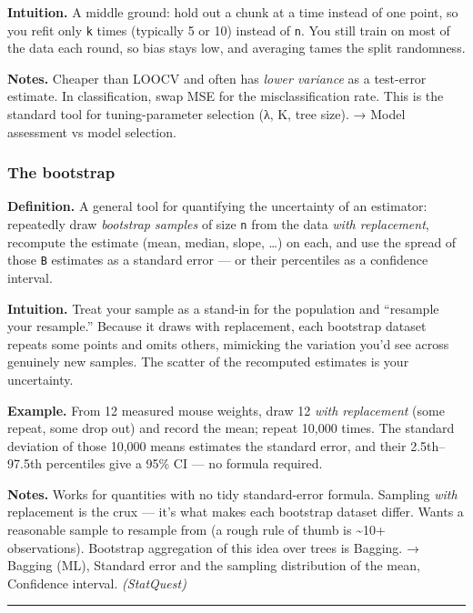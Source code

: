 \documentclass[
  10pt,
  letterpaper,
  onecolumn]{article}
\begin{document}
\textbf{Intuition.} A middle ground: hold out a chunk at a time instead
of one point, so you refit only \texttt{k} times (typically 5 or 10)
instead of \texttt{n}. You still train on most of the data each round,
so bias stays low, and averaging tames the split randomness.

\textbf{Notes.} Cheaper than LOOCV and often has \emph{lower variance}
as a test-error estimate. In classification, swap MSE for the
misclassification rate. This is the standard tool for tuning-parameter
selection (λ, K, tree size). → Model assessment vs model selection.

\hypertarget{the-bootstrap}{%
\subsubsection{The bootstrap}\label{the-bootstrap}}

\textbf{Definition.} A general tool for quantifying the uncertainty of
an estimator: repeatedly draw \emph{bootstrap samples} of size
\texttt{n} from the data \emph{with replacement}, recompute the estimate
(mean, median, slope, \ldots) on each, and use the spread of those
\texttt{B} estimates as a standard error --- or their percentiles as a
confidence interval.

\textbf{Intuition.} Treat your sample as a stand-in for the population
and ``resample your resample.'' Because it draws with replacement, each
bootstrap dataset repeats some points and omits others, mimicking the
variation you'd see across genuinely new samples. The scatter of the
recomputed estimates is your uncertainty.

\textbf{Example.} From 12 measured mouse weights, draw 12 \emph{with
replacement} (some repeat, some drop out) and record the mean; repeat
10,000 times. The standard deviation of those 10,000 means estimates the
standard error, and their 2.5th--97.5th percentiles give a 95\% CI ---
no formula required.

\textbf{Notes.} Works for quantities with no tidy standard-error
formula. Sampling \emph{with} replacement is the crux --- it's what
makes each bootstrap dataset differ. Wants a reasonable sample to
resample from (a rough rule of thumb is \textasciitilde10+
observations). Bootstrap aggregation of this idea over trees is Bagging.
→ Bagging (ML), Standard error and the sampling distribution of the
mean, Confidence interval. \emph{(StatQuest)}

\begin{center}\rule{0.5\linewidth}{0.5pt}\end{center}
\end{document}
